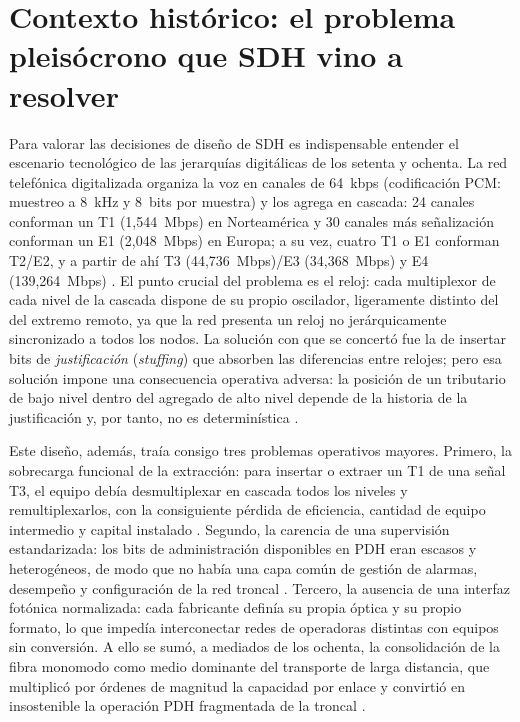 \documentclass[12pt,a4paper]{article}
\begin{document}
\section{Contexto histórico: el problema pleisócrono que SDH vino a resolver}

Para valorar las decisiones de diseño de SDH es indispensable entender el escenario tecnológico de las jerarquías digitálicas de los setenta y ochenta. La red telefónica digitalizada organiza la voz en canales de 64~kbps (codificación PCM: muestreo a 8~kHz y 8~bits por muestra) y los agrega en cascada: 24 canales conforman un T1 (1{,}544~Mbps) en Norteamérica y 30 canales más señalización conforman un E1 (2{,}048~Mbps) en Europa; a su vez, cuatro T1 o E1 conforman T2/E2, y a partir de ahí T3 (44{,}736~Mbps)/E3 (34{,}368~Mbps) y E4 (139{,}264~Mbps) \cite{stallings2004, tanenbaum2012}. El punto crucial del problema es el reloj: cada multiplexor de cada nivel de la cascada dispone de su propio oscilador, ligeramente distinto del del extremo remoto, ya que la red presenta un reloj no jerárquicamente sincronizado a todos los nodos. La solución con que se concertó fue la de insertar bits de \emph{justificación} (\emph{stuffing}) que absorben las diferencias entre relojes; pero esa solución impone una consecuencia operativa adversa: la posición de un tributario de bajo nivel dentro del agregado de alto nivel depende de la historia de la justificación y, por tanto, no es determinística \cite{itug707, tanenbaum2012}.

Este diseño, además, traía consigo tres problemas operativos mayores. Primero, la sobrecarga funcional de la extracción: para insertar o extraer un T1 de una señal T3, el equipo debía desmultiplexar en cascada todos los niveles y remultiplexarlos, con la consiguiente pérdida de eficiencia, cantidad de equipo intermedio y capital instalado \cite{stallings2004}. Segundo, la carencia de una supervisión estandarizada: los bits de administración disponibles en PDH eran escasos y heterogéneos, de modo que no había una capa común de gestión de alarmas, desempeño y configuración de la red troncal \cite{tanenbaum2012, ituG803}. Tercero, la ausencia de una interfaz fotónica normalizada: cada fabricante definía su propia óptica y su propio formato, lo que impedía interconectar redes de operadoras distintas con equipos sin conversión. A ello se sumó, a mediados de los ochenta, la consolidación de la fibra monomodo como medio dominante del transporte de larga distancia, que multiplicó por órdenes de magnitud la capacidad por enlace y convirtió en insostenible la operación PDH fragmentada de la troncal \cite{stallings2004, tanenbaum2012}.
\end{document}
